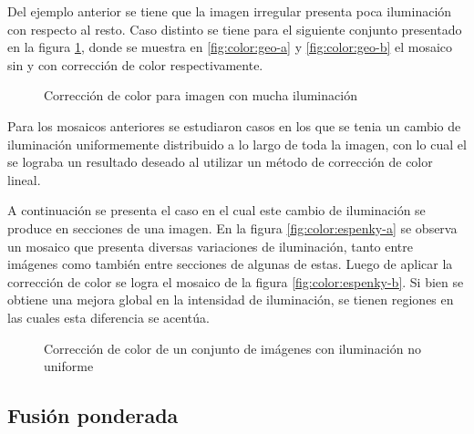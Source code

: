 Del ejemplo anterior se tiene que la imagen irregular presenta poca iluminación con respecto al resto. Caso distinto se tiene para el siguiente conjunto presentado en la figura \ref{imagen:color:0233}, donde se muestra en \ref{fig:color:geo-a} y \ref{fig:color:geo-b} el mosaico sin y con corrección de color respectivamente. 

\begin{figure}[H]
	\centering     %
	
	\caption[Resultado de corrección de color]{Corrección de color para imagen con mucha iluminación}
	\label{imagen:color:0233}
\end{figure}

Para los mosaicos anteriores se estudiaron casos en los que se tenia un cambio de iluminación uniformemente distribuido a lo largo de toda la imagen, con lo cual el se lograba un resultado deseado al utilizar un método de corrección de color lineal.

A continuación se presenta el caso en el cual este cambio de iluminación se produce en secciones de una imagen. En la figura \ref{fig:color:espenky-a} se observa un mosaico que presenta diversas variaciones de iluminación, tanto entre imágenes como también entre secciones de algunas de estas. Luego de aplicar la corrección de color se logra el mosaico de la figura \ref{fig:color:espenky-b}. Si bien se obtiene una mejora global en la intensidad de iluminación, se tienen regiones en las cuales esta diferencia se acentúa.

\begin{figure}[H]
	\centering     %
	
	\caption[Resultado de corrección de color: \textit{Espenky}]{Corrección de color de un conjunto de imágenes con iluminación no uniforme}
	\label{imagen:color:espenky}
\end{figure}

\subsection*{Fusión ponderada}

